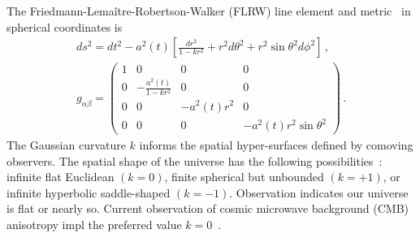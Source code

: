 The Friedmann-Lema{\^i}tre-Robertson-Walker (FLRW) line element and metric~\cite{hartle2003gravity,hobson,misner1973gravitation,weinberg1972gravitation} in spherical coordinates is
\begin{gather}
 \label{FLRW} ds^2=dt^2-a^2(t)\left[\frac{dr^2}{1-kr^{2}}+r^{2}d\theta^2+r^{2}\sin\theta^{2}d\phi^2\right]\,,\\
 g_{\alpha\beta}=
 \begin{pmatrix}
  1&0&0&0\\
  0&-\frac{a^{2}(t)}{1-kr^{2}}&0&0\\
  0&0&-a^{2}(t)r^{2}&0\\
  0&0&0&-a^{2}(t)r^{2}\sin\theta^{2}
 \end{pmatrix}\,.
\end{gather}
The Gaussian curvature $k$ informs the spatial hyper-surfaces defined by comoving observers. The spatial shape of the universe has the following possibilities~\cite{Planck:2018vyg}: infinite flat Euclidean $(k=0)$, finite spherical but unbounded $(k=+1)$, or infinite hyperbolic saddle-shaped $(k=-1)$. Observation indicates our universe is flat or nearly so. Current observation of cosmic microwave background (CMB) anisotropy impl the preferred value $k=0$~\cite{Planck:2013pxb,Planck:2015fie,Planck:2018vyg}.




